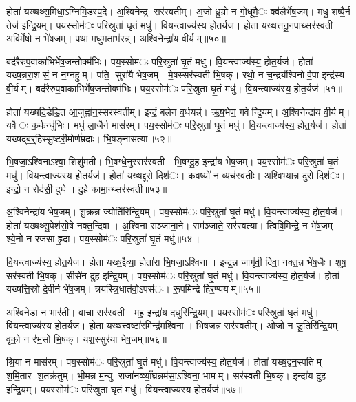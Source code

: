 होता॑ यख्षथ्स॒मिधा॒ऽग्निमि॒डस्प॒दे। अ॒श्विनेन्द्र॒ सर॑स्वतीम्। अ॒जो धू॒म्रो न गो॒धूमै॒ः क्व॑लैर्भेष॒जम्। मधु॒ शष्पै॒र्न तेज॑ इन्द्रि॒यम्। पय॒स्सोम॑ः परि॒स्रुता॑ घृ॒तं मधु॑। वि॒यन्त्वाज्य॑स्य॒ होत॒र्यज॑। होता॑ यख्ष॒त्तनू॒नपा॒थ्सर॑स्वती। अवि॑र्मे॒षो न भे॑ष॒जम्। प॒था मधु॑म॒ताभ॑रन्न्। अ॒श्विनेन्द्रा॑य वी॒र्यम्॥५०॥

बद॑रैरुप॒वाका॑भिर्भेष॒जन्तोक्म॑भिः। पय॒स्सोम॑ः परि॒स्रुता॑ घृ॒तं मधु॑। वि॒यन्त्वाज्य॑स्य॒ होत॒र्यज॑। होता॑ यख्ष॒न्नरा॒शसं॒ न न॒ग्नहुम्। पति॒ सुरा॑यै भेष॒जम्। मे॒षस्सर॑स्वती भि॒षक्। रथो॒ न च॒न्द्र्य॑श्विनोर्व॒पा इन्द्र॑स्य वी॒र्यम्। बद॑रैरुप॒वाका॑भिर्भेष॒जन्तोक्म॑भिः। पय॒स्सोम॑ः परि॒स्रुता॑ घृ॒तं मधु॑। वि॒यन्त्वाज्य॑स्य॒ होत॒र्यज॑॥५१॥

होता॑ यख्षदि॒डेडि॒त आ॒जुह्वा॑न॒स्सर॑स्वतीम्। इन्द्रं॒ बले॑न व॒र्धयन्न्॑। ऋ॒ष॒भेण॒ गवेन्द्रि॒यम्। अ॒श्विनेन्द्रा॑य वी॒र्यम्। यवैः क॒र्कन्धु॑भिः। मधु॑ ला॒जैर्न मास॑रम्। पय॒स्सोम॑ः परि॒स्रुता॑ घृ॒तं मधु॑। वि॒यन्त्वाज्य॑स्य॒ होत॒र्यज॑। होता॑ यख्षद्ब॒र्॒हिस्सु॒ष्टरी॒मोर्ण॑म्रदाः। भि॒षङ्नास॑त्या॥५२॥

भि॒षजा॒ऽश्विनाऽश्वा॒ शिशु॑मती। भि॒षग्धे॒नुस्सर॑स्वती। भि॒षग्दु॒ह इन्द्रा॑य भेष॒जम्। पय॒स्सोम॑ः परि॒स्रुता॑ घृ॒तं मधु॑। वि॒यन्त्वाज्य॑स्य॒ होत॒र्यज॑। होता॑ यख्ष॒द्दुरो॒ दिश॑ः। क॒व॒ष्यो॑ न व्यच॑स्वतीः। अ॒श्विभ्या॒न्न दुरो॒ दिश॑ः। इन्द्रो॒ न रोद॑सी॒ दुघे। दु॒हे कामा॒न्थ्सर॑स्वती॥५३॥

अ॒श्विनेन्द्रा॑य भेष॒जम्। शु॒क्रन्न ज्योति॑रिन्द्रि॒यम्। पय॒स्सोम॑ः परि॒स्रुता॑ घृ॒तं मधु॑। वि॒यन्त्वाज्य॑स्य॒ होत॒र्यज॑। होता॑ यख्षथ्सु॒पेश॑सो॒षे नक्त॒न्दिवा। अ॒श्विना॑ सञ्जाना॒ने। सम॑ञ्जाते॒ सर॑स्वत्या। त्विषि॒मिन्द्रे॒ न भे॑ष॒जम्। श्ये॒नो न रज॑सा हृ॒दा। पय॒स्सोम॑ः परि॒स्रुता॑ घृ॒तं मधु॑॥५४॥

वि॒यन्त्वाज्य॑स्य॒ होत॒र्यज॑। होता॑ यख्ष॒द्दैव्या॒ होता॑रा भि॒षजा॒ऽश्विना। इन्द्र॒न्न जागृ॑वी॒ दिवा॒ नक्त॒न्न भे॑ष॒जैः। शूष॒ सर॑स्वती भि॒षक्। सीसे॑न दुह इन्द्रि॒यम्। पय॒स्सोम॑ः परि॒स्रुता॑ घृ॒तं मधु॑। वि॒यन्त्वाज्य॑स्य॒ होत॒र्यज॑। होता॑ यख्षत्ति॒स्रो दे॒वीर्न भे॑ष॒जम्। त्रय॑स्त्रि॒धात॑वो॒ऽपस॑ः। रू॒पमिन्द्रे॑ हिर॒ण्ययम्॥५५॥

अ॒श्विनेडा॒ न भार॑ती। वा॒चा सर॑स्वती। मह॒ इन्द्रा॑य दधुरिन्द्रि॒यम्। पय॒स्सोम॑ः परि॒स्रुता॑ घृ॒तं मधु॑। वि॒यन्त्वाज्य॑स्य॒ होत॒र्यज॑। होता॑ यख्ष॒त्त्वष्टा॑र॒मिन्द्र॑म॒श्विना। भि॒षज॒न्न सर॑स्वतीम्। ओजो॒ न जू॒तिरि॑न्द्रि॒यम्। वृको॒ न र॑भ॒सो भि॒षक्। यश॒स्सुर॑या भेष॒जम्॥५६॥

श्रि॒या न मास॑रम्। पय॒स्सोम॑ः परि॒स्रुता॑ घृ॒तं मधु॑। वि॒यन्त्वाज्य॑स्य॒ होत॒र्यज॑। होता॑ यख्ष॒द्वन॒स्पतिम्। श॒मि॒तार श॒तक्र॑तुम्। भी॒मन्न म॒न्यु राजा॑नव्व्याँ॒घ्रन्नम॑सा॒ऽश्विना॒ भामम्। सर॑स्वती भि॒षक्। इन्दा॑य दुह इन्द्रि॒यम्। पय॒स्सोम॑ः परि॒स्रुता॑ घृ॒तं मधु॑। वि॒यन्त्वाज्य॑स्य॒ होत॒र्यज॑॥५७॥

